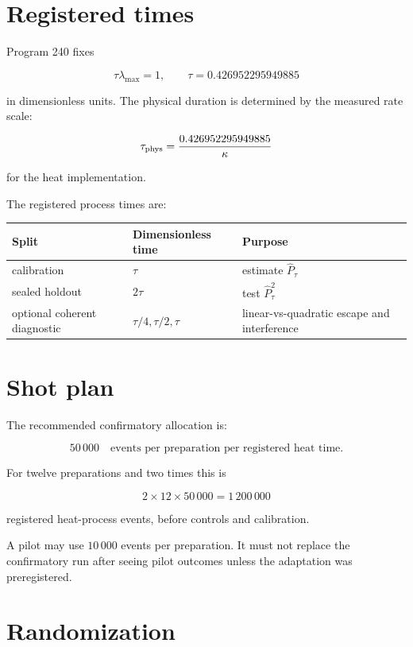 \documentclass[11pt,a4paper,openany]{report}
\begin{document}
\section{Registered times}

Program 240 fixes

\[
\tau\lambda_{\max}=1,
\qquad
\tau=0.426952295949885
\]

in dimensionless units. The physical duration is determined by the measured rate scale:

\[
\tau_{\rm phys}=\frac{0.426952295949885}{\kappa}
\]

for the heat implementation.

The registered process times are:

\begin{center}
\begingroup\small
\setlength{\tabcolsep}{3.5pt}
\renewcommand{\arraystretch}{1.16}
\begin{longtable}{@{}p{}p{}p{}@{}}
\toprule
\textbf{Split} & \textbf{Dimensionless time} & \textbf{Purpose} \\
\midrule
\endhead
calibration & \(\tau\) & estimate \(\widehat P_\tau\) \\
sealed holdout & \(2\tau\) & test \(\widehat P_\tau^2\) \\
optional coherent diagnostic & \(\tau/4,\tau/2,\tau\) & linear-vs-quadratic escape and interference \\
\bottomrule
\end{longtable}
\endgroup
\end{center}

\section{Shot plan}

The recommended confirmatory allocation is:

\[
50\,000
\quad\text{events per preparation per registered heat time}.
\]

For twelve preparations and two times this is

\[
2\times12\times50\,000=1\,200\,000
\]

registered heat-process events, before controls and calibration.

A pilot may use \(10\,000\) events per preparation. It must not replace the confirmatory run after seeing pilot outcomes unless the adaptation was preregistered.

\section{Randomization}
\end{document}
